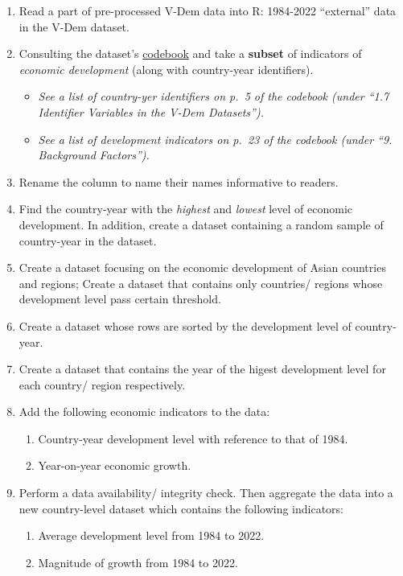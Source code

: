 \documentclass[
]{article}
\providecommand{\tightlist}{%
  \setlength{\itemsep}{0pt}\setlength{\parskip}{0pt}}
\begin{document}
\begin{enumerate}
\def\labelenumi{\arabic{enumi}.}
\tightlist
\item
  Read a part of pre-processed V-Dem data into R: 1984-2022 ``external''
  data in the V-Dem dataset.
\item
  Consulting the dataset's
  \href{https://github.com/haohanchen/HKU_POLI3148_23Fall/blob/main/_DataPublic_/vdem/documentation/codebook_v13.pdf}{codebook}
  and take a \textbf{subset} of indicators of \emph{economic
  development} (along with country-year identifiers).

  \begin{itemize}
  \item
    \emph{See a list of country-yer identifiers on p.~5 of the codebook
    (under ``1.7 Identifier Variables in the V-Dem Datasets'').}
  \item
    \emph{See a list of development indicators on p.~23 of the codebook
    (under ``9. Background Factors'').}
  \end{itemize}
\item
  Rename the column to name their names informative to readers.
\item
  Find the country-year with the \emph{highest} and \emph{lowest} level
  of economic development. In addition, create a dataset containing a
  random sample of country-year in the dataset.
\item
  Create a dataset focusing on the economic development of Asian
  countries and regions; Create a dataset that contains only countries/
  regions whose development level pass certain threshold.
\item
  Create a dataset whose rows are sorted by the development level of
  country-year.
\item
  Create a dataset that contains the year of the higest development
  level for each country/ region respectively.
\item
  Add the following economic indicators to the data:

  \begin{enumerate}
  \def\labelenumii{\arabic{enumii}.}
  \item
    Country-year development level with reference to that of 1984.
  \item
    Year-on-year economic growth.
  \end{enumerate}
\item
  Perform a data availability/ integrity check. Then aggregate the data
  into a new country-level dataset which contains the following
  indicators:

  \begin{enumerate}
  \def\labelenumii{\arabic{enumii}.}
  \item
    Average development level from 1984 to 2022.
  \item
    Magnitude of growth from 1984 to 2022.
  \end{enumerate}
\end{enumerate}
\end{document}
